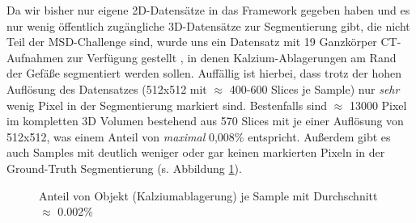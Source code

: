 Da wir bisher nur eigene 2D-Datensätze in das Framework gegeben haben und es nur wenig öffentlich zugängliche 3D-Datensätze zur Segmentierung gibt, die nicht Teil der MSD-Challenge \cite{msdChallenge} sind, wurde uns ein Datensatz mit 19 Ganzkörper CT-Aufnahmen zur Verfügung gestellt \cite{ctDatensatz}, in denen Kalzium-Ablagerungen am Rand der Gefäße segmentiert werden sollen.
Auffällig ist hierbei, dass trotz der hohen Auflösung des Datensatzes (512x512 mit $\approx$ 400-600 Slices je Sample) nur \textit{sehr} wenig Pixel in der Segmentierung markiert sind. Bestenfalls sind $\approx$ 13000 Pixel im kompletten 3D Volumen bestehend aus 570 Slices mit je einer Auflösung von 512x512, was einem Anteil von \textit{maximal} 0,008\% entspricht. Außerdem gibt es auch Samples mit deutlich weniger oder gar keinen markierten Pixeln in der Ground-Truth Segmentierung (s. Abbildung \ref{pic:Haeuf_109}).

\begin{figure}[H]


\caption{Anteil von Objekt (Kalziumablagerung) je Sample mit Durchschnitt $\approx$ 0.002\%}
\label{pic:Haeuf_109}
\end{figure}


